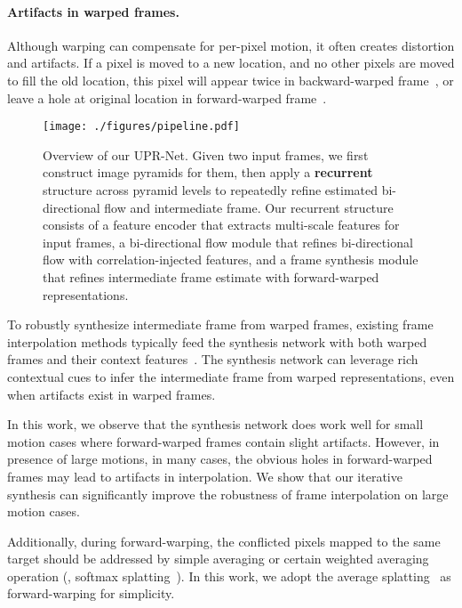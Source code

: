 \documentclass[10pt,twocolumn,letterpaper]{article}
\begin{document}
\paragraph{Artifacts in warped frames.}
Although warping can compensate for per-pixel motion, it often creates
distortion and artifacts.  If a pixel is moved to a new location, and no other
pixels are moved to fill the old location, this pixel will appear twice in
backward-warped frame~\cite{lu2020devon,lee2022enhanced}, or leave a hole at
original location in forward-warped frame~\cite{niklaus2018context}.


\begin{figure*}[!htb]
\centering
\texttt{[image: ./figures/pipeline.pdf]}
\caption{Overview of our UPR-Net. Given two input frames, we first construct
    image pyramids for them, then apply a \textbf{recurrent} structure across
    pyramid levels to repeatedly refine estimated bi-directional flow and
    intermediate frame. Our recurrent structure consists of a feature encoder
    that extracts multi-scale features for input frames, a bi-directional flow
    module that refines bi-directional flow with correlation-injected features,
    and a frame synthesis module that refines intermediate frame estimate with
    forward-warped representations.
}
\vspace{-0.25cm}
\label{fig:pipeline}
\end{figure*}



To robustly synthesize intermediate frame from warped frames, existing frame
interpolation methods typically feed the synthesis network with both warped
frames and their context
features~\cite{niklaus2018context,niklaus2020softmax,huang2020rife}.  The
synthesis network can leverage rich contextual cues to infer the intermediate
frame from warped representations, even when artifacts exist in warped frames.


In this work, we observe that the synthesis network does work well for small
motion cases where forward-warped frames contain slight artifacts.
However, in presence of large motions, in many cases, the obvious holes in
forward-warped frames may lead to artifacts in interpolation.  We show that
our iterative synthesis can significantly improve the robustness of frame
interpolation on large motion cases.


Additionally, during forward-warping, the conflicted pixels mapped to the same
target should be addressed by simple averaging or certain weighted averaging
operation (\eg, softmax splatting~\cite{niklaus2020softmax}).  In this work, we
adopt the average splatting~\cite{niklaus2020softmax} as forward-warping for
simplicity.
\end{document}
